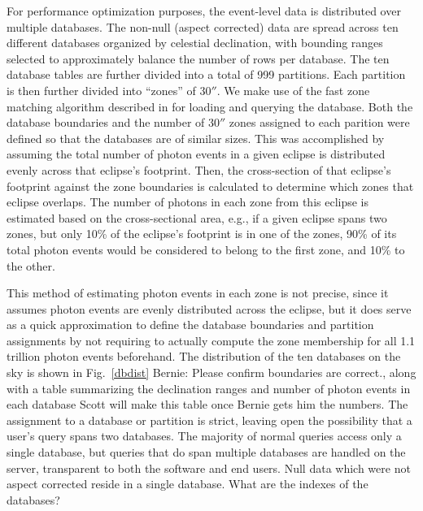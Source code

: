 \documentclass[5p]{elsarticle}
\begin{document}
For performance optimization purposes, the event-level data is distributed over multiple databases. The non-null (aspect corrected) data are spread across ten different databases organized by celestial declination, with bounding ranges selected to approximately balance the number of rows per database.  The ten database tables are further divided into a total of 999 partitions. Each partition is then further divided into ``zones'' of $30''$. We make use of the fast zone matching algorithm described in \citet{gra2006} for loading and querying the database.  Both the database boundaries and the number of $30''$ zones assigned to each parition were defined so that the databases are of similar sizes.  This was accomplished by assuming the total number of photon events in a given eclipse is distributed evenly across that eclipse's footprint.  Then, the cross-section of that eclipse's footprint against the zone boundaries is calculated to determine which zones that eclipse overlaps.  The number of photons in each zone from this eclipse is estimated based on the cross-sectional area, e.g., if a given eclipse spans two zones, but only 10\% of the eclipse's footprint is in one of the zones, 90\% of its total photon events would be considered to belong to the first zone, and 10\% to the other.

This method of estimating photon events in each zone is not precise, since it assumes photon events are evenly distributed across the eclipse, but it does serve as a quick approximation to define the database boundaries and partition assignments by not requiring to actually compute the zone membership for all 1.1 trillion photon events beforehand.  The distribution of the ten databases on the sky is shown in Fig.\ \ref{dbdist} {\color{red}Bernie: Please confirm boundaries are correct.}, along with a table summarizing the declination ranges and number of photon events in each database {\color{red}Scott will make this table once Bernie gets him the numbers}. The assignment to a database or partition is strict, leaving open the possibility that a user's query spans two databases. The majority of normal queries access only a single database, but queries that do span multiple databases are handled on the server, transparent to both the software and end users. Null data which were not aspect corrected reside in a single database.  {\color{red}What are the indexes of the databases?}
\end{document}
